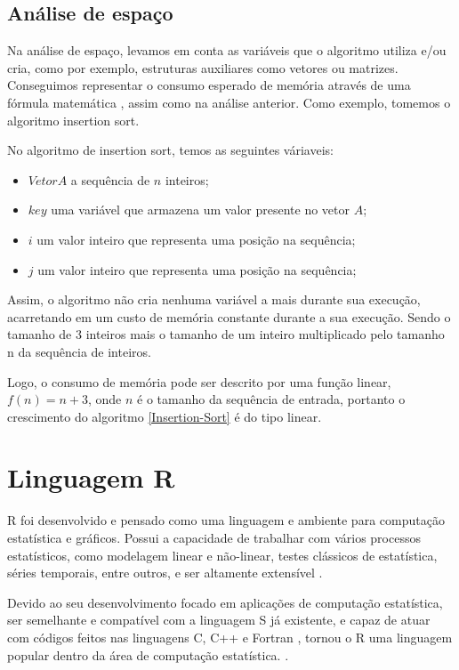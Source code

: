 \documentclass[
	12pt,				%
	openright,			%
	oneside,			%
	a4paper,			%
	english,			%
	brazil				%
	]{abntex2}
\begin{document}
\subsection{Análise de espaço}

Na análise de espaço, levamos em conta as variáveis que o algoritmo utiliza e/ou cria, como por exemplo, estruturas auxiliares como vetores ou 
matrizes. Conseguimos representar o consumo esperado de memória através de uma fórmula matemática \cite{introductionAnalysis}, assim como na 
análise anterior. Como exemplo, tomemos o algoritmo insertion sort.

No algoritmo de insertion sort, temos as seguintes váriaveis:

\begin{itemize}
	\item $Vetor A$ a sequência de $n$ inteiros;
	\item $key$ uma variável  que armazena um valor presente no vetor $A$;
	\item $i$ um valor inteiro que representa uma posição na sequência;
	\item $j$ um valor inteiro que representa uma posição na sequência;
\end{itemize}

Assim, o algoritmo não cria nenhuma variável a mais durante sua execução, acarretando em um custo de memória constante durante a sua execução. 
Sendo o tamanho de 3 inteiros mais o tamanho de um inteiro multiplicado pelo tamanho n da sequência de inteiros.

Logo, o consumo de memória pode ser descrito por uma função linear, $f(n) = n + 3$, onde $n$ é o tamanho da sequência de entrada, portanto 
o crescimento do algoritmo \ref{Insertion-Sort} é do tipo linear.

\section{Linguagem R}

R foi desenvolvido e pensado como uma linguagem e ambiente para computação estatística e gráficos. Possui a capacidade de trabalhar com 
vários processos estatísticos, como modelagem linear e não-linear, testes clássicos de estatística, séries temporais, entre outros, 
e ser altamente extensível \cite{ling_r}.

Devido ao seu desenvolvimento focado em aplicações de computação estatística, ser semelhante e compatível com a linguagem S já existente, 
e capaz de atuar com códigos feitos nas linguagens C, C++ e Fortran \cite{ling_r}, tornou o R uma linguagem popular dentro da área 
de computação estatística. \cite{linguagem_r}.
\end{document}

